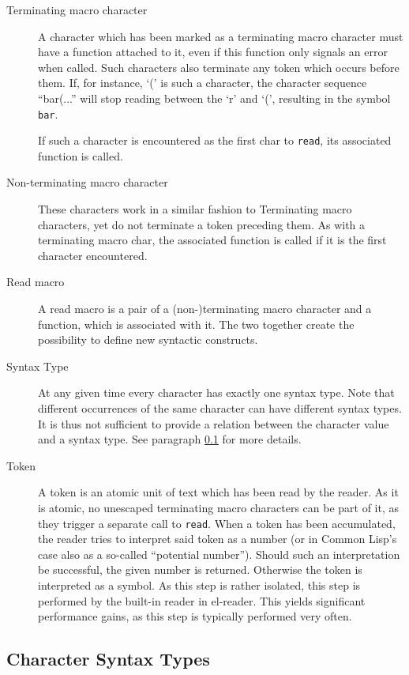 \documentclass[a4paper,10pt,twoside]{report}
\newcommand{\cl}{Common Lisp}
\newcommand{\elr}{el-reader}
\newcommand{\sym}[1]{\texttt{#1}}
\newcommand{\fun}[1]{\texttt{#1}}
\newcommand{\Read}{\fun{read}}
\begin{document}
\begin{description}
\item[Terminating macro character] A character which has been marked as a
  terminating macro character must have a function attached to it, even if this
  function only signals an error when called.  Such characters also terminate
  any token which occurs before them.  If, for instance, `(' is such a
  character, the character sequence ``bar(...'' will stop reading between the
  `r' and `(', resulting in the symbol \sym{bar}.

  If such a character is encountered as the first char to \Read{}, its
  associated function is called.
\item[Non-terminating macro character] These characters work in a similar
  fashion to Terminating macro characters, yet do not terminate a token
  preceding them.  As with a terminating macro char, the associated function is
  called if it is the first character encountered.
\item [Read macro] A read macro is a pair of a (non-)terminating macro character
  and a function, which is associated with it.  The two together create the
  possibility to define new syntactic constructs.
\item[Syntax Type] At any given time every character has exactly one syntax
  type.  Note that different occurrences of the same character can have
  different syntax types.  It is thus not sufficient to provide a relation
  between the character value and a syntax type.  See paragraph
  \ref{subsubsec:syntax-type} for more details.
\item[Token] A token is an atomic unit of text which has been read by the
  reader.  As it is atomic, no unescaped terminating macro characters can be
  part of it, as they trigger a separate call to \Read{}.  When a token has been
  accumulated, the reader tries to interpret said token as a number (or in
  \cl{}’s case also as a so-called ``potential number'').  Should such an
  interpretation be successful, the given number is returned.  Otherwise the
  token is interpreted as a symbol.  As this step is rather isolated, this step
  is performed by the built-in reader in \elr{}.  This yields significant
  performance gains, as this step is typically performed very often.
\end{description}

\subsection{Character Syntax Types}
\label{subsubsec:syntax-type}
\end{document}
